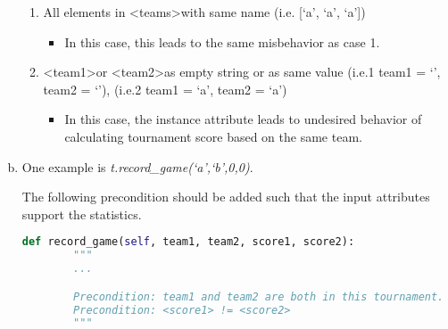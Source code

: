 \documentclass[12pt]{article}
\begin{document}
\begin{enumerate}[a.]
\begin{mdframed}
\begin{enumerate}[1.]
            \item All elements in \textless teams\textgreater with same
            name (i.e. [`a', `a', `a'])
            \begin{itemize}
                \item In this case, this leads to the same misbehavior as case 1.
            \end{itemize}
            \item \textless team1\textgreater or \textless team2\textgreater as
            empty string or as same value (i.e.1 team1 = `', team2 = `'), (i.e.2
            team1 = `a', team2 = `a')
            \begin{itemize}
                \item In this case, the instance attribute leads to undesired behavior
                of calculating tournament score based on the same team.
            \end{itemize}
        \end{enumerate}
    \end{mdframed}

    \item

    One example is \textit{t.record\_game(`a',`b',0,0)}.

    \bigskip

    The following precondition should be added such that the input attributes
    support the statistics.

    \begin{lstlisting}[language=Python]
    def record_game(self, team1, team2, score1, score2):
        """
        ...

        Precondition: team1 and team2 are both in this tournament.
        Precondition: <score1> != <score2>
        """

    \end{lstlisting}

\end{enumerate}
\end{document}
